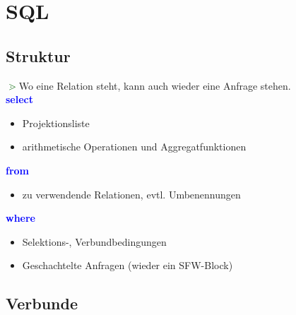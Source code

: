 \documentclass{scrartcl}
\newcommand{\key}[1]{{\textcolor{blue}{\textbf{#1}}}}
\newcommand{\hint}{{\textcolor{darkgreen}{\textbf{$\gtrdot$}}}}
\begin{document}
%

\section{SQL}

\subsection{Struktur}

\hint Wo eine Relation steht, kann auch wieder eine Anfrage stehen.\\

\key{select}
\begin{itemize}
	\itemsep0em
	\item Projektionsliste
	\item arithmetische Operationen und Aggregatfunktionen
\end{itemize}
\key{from}
\begin{itemize}
	\itemsep0em
	\item zu verwendende Relationen, evtl. Umbenennungen
\end{itemize}
\key{where}
\begin{itemize}
	\itemsep0em
	\item Selektions-, Verbundbedingungen
	\item Geschachtelte Anfragen (wieder ein SFW-Block)
\end{itemize}

\subsection{Verbunde}
\end{document}
